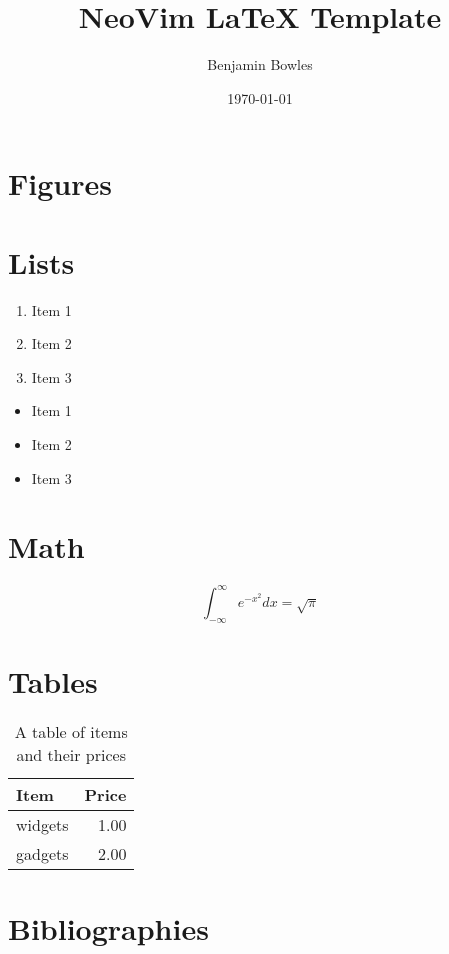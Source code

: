\documentclass[12pt]{article}
\title{NeoVim LaTeX Template}
\author{Benjamin Bowles}
\date{\today}
\begin{document}
\maketitle
\newpage

\tableofcontents
\newpage

\section{Figures}
\newpage

\section{Lists}
\begin{enumerate}
    \item  Item 1
    \item  Item 2
    \item  Item 3
\end{enumerate}
\begin{itemize}
    \item  Item 1
    \item  Item 2
    \item  Item 3
\end{itemize}
\newpage

\section{Math}
\begin{equation}
    \int_{-\infty}^{\infty} e^{-x^2} dx = \sqrt{\pi}
\end{equation}
\newpage

\section{Tables}
\begin{table}
\centering
\begin{tabular}{l|r}
    Item & Price \\\hline
    widgets & 1.00 \\
    gadgets & 2.00 \\
\end{tabular}
\caption{\label{tab:widgets}A table of items and their prices}
\end{table}
\newpage

\section{Bibliographies}
\cite{TestBook}
\cite{TestArticle}




\newpage
\end{document}
